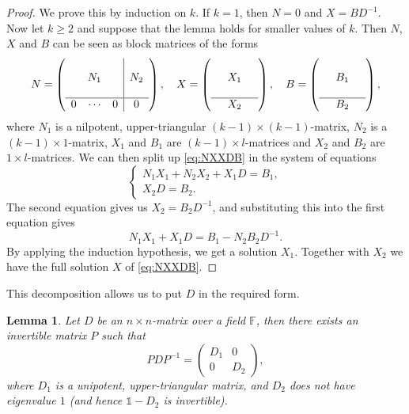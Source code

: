 \documentclass[a4paper]{article}
\theoremstyle{plain}
\newtheorem{lemma}[theorem]{Lemma}
\theoremstyle{definition}
\theoremstyle{remark}
\newcommand{\I}{\mathds{1}}
\newcommand{\FF}{{\mathbb{F}}}
\begin{document}
\begin{proof}
	We prove this by induction on \(k\). If \(k = 1\), then \(N = 0\) and \(X = BD^{-1}\). Now let \(k \geq 2\) and suppose that the lemma holds for smaller values of \(k\). Then \(N\), \(X\) and \(B\) can be seen as block matrices of the forms
	\begin{equation*}
	N = \left(\begin{array}{ccc|c}
	&&&\\
	&N_1 & & N_2\\
	&&&\\
	\hline
	0 & \cdots & 0 & 0
	\end{array}\right),\quad X =  \left(\begin{array}{ccc}
	&&\\
	&X_1&\\
	&&\\
	\hline
	 & X_2 &
	\end{array}\right),\quad B =  \left(\begin{array}{ccc}
	&&\\
	&B_1&\\
	&&\\
	\hline
	& B_2 &
	\end{array}\right),
	\end{equation*}
	where \(N_1\) is a nilpotent, upper-triangular \((k-1) \times (k-1)\)-matrix, \(N_2\) is a \((k-1)\times 1\)-matrix, \(X_1\) and \(B_1\) are \((k-1)\times l\)-matrices and \(X_2\) and \(B_2\) are \(1\times l\)-matrices. We can then split up \eqref{eq:NXXDB} in the system of equations
	\begin{equation*}
	\begin{cases}
	N_1 X_1 + N_2 X_2 + X_1 D = B_1,\\
	X_2 D = B_2.
	\end{cases}
	\end{equation*}
	The second equation gives us \(X_2 = B_2D^{-1}\), and substituting this into the first equation gives
	\begin{equation*}
	N_1X_1 + X_1 D = B_1 - N_2B_2D^{-1}.
	\end{equation*}
	By applying the induction hypothesis, we get a solution \(X_1\). Together with \(X_2\) we have the full solution \(X\) of \eqref{eq:NXXDB}.
\end{proof}
This decomposition allows us to put \(D\) in the required form.
\begin{lemma}
	\label{lem:Dblocks}
	Let \(D\) be an \(n \times n\)-matrix over a field \(\FF\), then there exists an invertible matrix \(P\) such that
	\begin{equation*}
	PDP^{-1} = \left(\begin{array}{cc}
	D_1 & 0\\0 & D_2
	\end{array}\right),
	\end{equation*}
	where \(D_1\) is a unipotent, upper-triangular matrix, and \(D_2\) does not have eigenvalue \(1\) (and hence \(\I-D_2\) is invertible).
\end{lemma}
\end{document}
